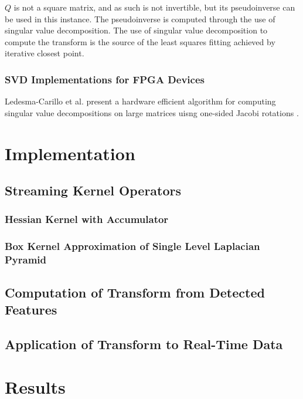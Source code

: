 \documentclass{article}
\begin{document}
$Q$ is not a square matrix, and as such is not invertible, but its pseudoinverse can be used in this instance. The pseudoinverse is computed through the use of singular value decomposition. The use of singular value decomposition to compute the transform is the source of the least squares fitting achieved by iterative closest point.

\subsubsection{SVD Implementations for FPGA Devices}

Ledesma-Carillo et al. present a hardware efficient algorithm for computing singular value decompositions on large matrices uisng one-sided Jacobi rotations \cite{ledesma-carrillo_reconfigurable_2011}.

\section{Implementation}

\subsection{Streaming Kernel Operators}

\subsubsection{Hessian Kernel with Accumulator}

\subsubsection{Box Kernel Approximation of Single Level Laplacian Pyramid}

\subsection{Computation of Transform from Detected Features}

\subsection{Application of Transform to Real-Time Data}

\section{Results}

\pagebreak



\end{document}
